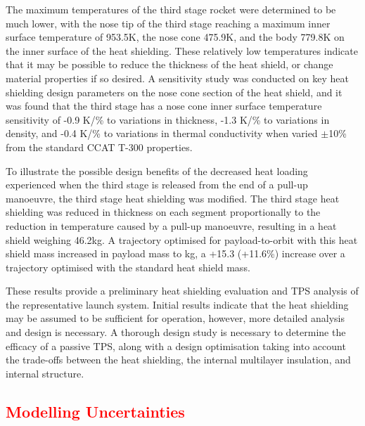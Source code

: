 The maximum temperatures of the third stage rocket were determined to be much lower, with the nose tip of the third stage reaching a maximum inner surface temperature of 953.5K, the nose cone  475.9K, and the body 779.8K on the inner surface of the heat shielding. These relatively low temperatures indicate that it may be possible to reduce the thickness of the heat shield, or change material properties if so desired. A sensitivity study was conducted on key heat shielding design parameters on the nose cone section of the heat shield, and it was found that the third stage has a nose cone inner surface temperature sensitivity of -0.9 K/\% to variations in thickness, -1.3 K/\% to variations in density, and -0.4 K/\% to variations in thermal conductivity when varied $\pm$10\% from the standard CCAT T-300 properties. 

To illustrate the possible design benefits of the decreased heat loading experienced when the third stage is released from the end of a pull-up manoeuvre, the third stage heat shielding was modified. The third stage heat shielding was reduced in thickness on each segment proportionally to the reduction in temperature  caused by a pull-up manoeuvre, resulting in a heat shield weighing 46.2kg. A trajectory optimised for payload-to-orbit with this heat shield mass increased in payload mass to \PayloadToOrbitTPSreduced kg, a  +15.3 (+11.6\%) increase over a trajectory optimised with the standard heat shield mass.

These results provide a preliminary heat shielding evaluation and TPS analysis of the representative launch system. Initial results indicate that the heat shielding may be assumed to be sufficient for operation, however, more detailed analysis and design is necessary. A thorough design study is necessary to determine the efficacy of a passive TPS, along with a design optimisation taking into account the trade-offs between the heat shielding, the internal multilayer insulation, and internal structure. 


\textcolor{red}{
\chapter{Modelling Uncertainties}
}



